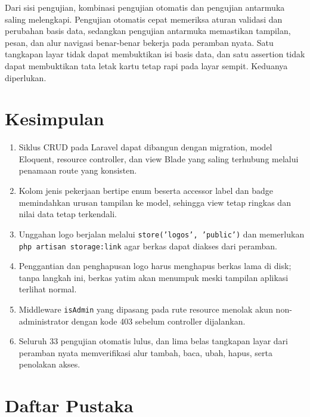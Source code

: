 \documentclass[12pt,a4paper]{article}
\begin{document}
Dari sisi pengujian, kombinasi pengujian otomatis dan pengujian antarmuka saling melengkapi. Pengujian otomatis cepat memeriksa aturan validasi dan perubahan basis data, sedangkan pengujian antarmuka memastikan tampilan, pesan, dan alur navigasi benar-benar bekerja pada peramban nyata. Satu tangkapan layar tidak dapat membuktikan isi basis data, dan satu assertion tidak dapat membuktikan tata letak kartu tetap rapi pada layar sempit. Keduanya diperlukan.

\section{Kesimpulan}

\begin{enumerate}[leftmargin=1.4cm, itemsep=3pt]
  \item Siklus CRUD pada Laravel dapat dibangun dengan migration, model Eloquent, resource controller, dan view Blade yang saling terhubung melalui penamaan route yang konsisten.
  \item Kolom jenis pekerjaan bertipe enum beserta accessor label dan badge memindahkan urusan tampilan ke model, sehingga view tetap ringkas dan nilai data tetap terkendali.
  \item Unggahan logo berjalan melalui \texttt{store('logos', 'public')} dan memerlukan \texttt{php artisan storage:link} agar berkas dapat diakses dari peramban.
  \item Penggantian dan penghapusan logo harus menghapus berkas lama di disk; tanpa langkah ini, berkas yatim akan menumpuk meski tampilan aplikasi terlihat normal.
  \item Middleware \texttt{isAdmin} yang dipasang pada rute resource menolak akun non-administrator dengan kode 403 sebelum controller dijalankan.
  \item Seluruh 33 pengujian otomatis lulus, dan lima belas tangkapan layar dari peramban nyata memverifikasi alur tambah, baca, ubah, hapus, serta penolakan akses.
\end{enumerate}

\clearpage
\section*{Daftar Pustaka}
\end{document}
